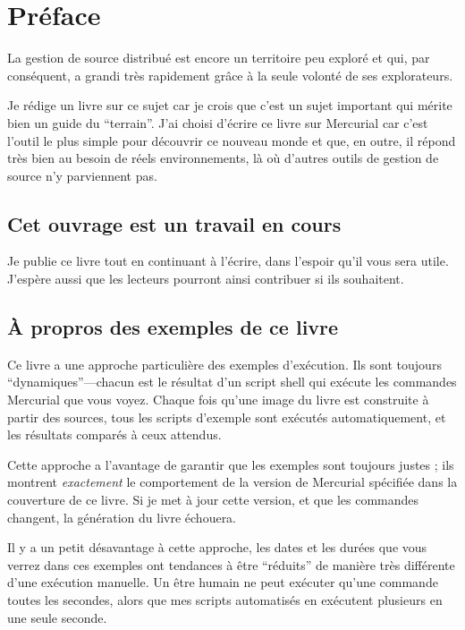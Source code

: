 \chapter*{Préface}
\label{chap:preface}

La gestion de source distribué est encore un territoire peu exploré
et qui, par conséquent, a grandi très rapidement grâce à la seule 
volonté de ses explorateurs.

Je rédige un livre sur ce sujet car je crois que c'est un sujet 
important qui mérite bien un guide du ``terrain''. J'ai choisi d'écrire
ce livre sur Mercurial car c'est l'outil le plus simple pour découvrir
ce nouveau monde et que, en outre, il répond très bien au besoin de
réels environnements, là où d'autres outils de gestion de source n'y
parviennent pas.

\section{Cet ouvrage est un travail en cours}

Je publie ce livre tout en continuant à l'écrire, dans l'espoir qu'il
vous sera utile. J'espère aussi que les lecteurs pourront ainsi contribuer
si ils souhaitent.

\section{À propros des exemples de ce livre}

Ce livre a une approche particulière des exemples d'exécution. Ils sont 
toujours ``dynamiques''---chacun est le résultat d'un script shell qui
exécute les commandes Mercurial que vous voyez. Chaque fois qu'une 
image du livre est construite à partir des sources, tous les scripts d'exemple
sont exécutés automatiquement, et les résultats comparés à ceux attendus.

Cette approche a l'avantage de garantir que les exemples sont toujours
justes ; ils montrent \emph{exactement} le comportement de la version de
Mercurial spécifiée dans la couverture de ce livre. Si je met à jour cette
version, et que les commandes changent, la génération du livre échouera.

Il y a un petit désavantage à cette approche, les dates et les
durées que vous verrez dans ces exemples ont tendances à être
``réduits'' de manière très différente d'une exécution manuelle. Un être humain
ne peut exécuter qu'une commande toutes les secondes, alors que mes scripts
automatisés en exécutent plusieurs en une seule seconde.

